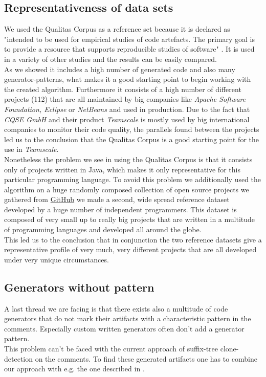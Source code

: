 \subsection{Representativeness of data sets}
We used the Qualitas Corpus as a reference set because it is declared as "intended to be used for empirical studies of code artefacts. The primary goal is to provide a resource that supports reproducible studies of software" \cite{TemperoEwanandAnslowCraigandDietrichJensandHanTedandLiJingandLumpeMarkusandMeltonHaydenandNoble2010a}. It is used in a variety of other studies and the results can be easily compared.\\
As we showed it includes a high number of generated code and also many generator-patterns, what makes it a good starting point to begin working with the created algorithm. Furthermore it consists of a high number of different projects (112) that are all maintained by big companies like \textit{Apache Software Foundation, Eclipse} or \textit{NetBeans}  and used in production. Due to the fact that \textit{CQSE GmbH} and their product \textit{Teamscale} is mostly used by big international companies to monitor their code quality, the parallels found between the projects led us to the conclusion that the Qualitas Corpus is a good starting point for the use in \textit{Teamscale}.\\
Nonetheless the problem we see in using the Qualitas Corpus is that it consists only of projects written in Java, which makes it only representative for this particular programming language. To avoid this problem we additionally used the algorithm on a huge randomly composed collection of open source projects we gathered from \href{github.com}{GitHub} we made a second, wide spread reference dataset developed by a huge number of independent programmers. This dataset is composed of very small up to really big projects that are written in a multitude of programming languages and developed all around the globe.\\
This led us to the conclusion that in conjunction the two reference datasets give a representative profile of very much, very different projects that are all developed under very unique circumstances.

\subsection{Generators without pattern}
A last thread we are facing is that there exists also a multitude of code generators that do not mark their artifacts with a characteristic pattern in the comments. Especially custom written generators often don't add a generator pattern.\\
This problem can't be faced with the current approach of suffix-tree clone-detection on the comments. To find these generated artifacts one has to combine our approach with e.g. the one described in \cite{Bernwieser2014}.